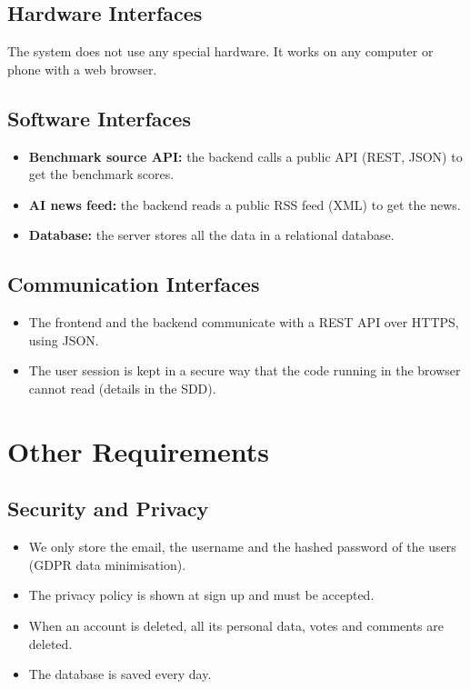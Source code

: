 \documentclass[11pt,a4paper]{article}
\begin{document}
\subsection{Hardware Interfaces}

The system does not use any special hardware. It works on any computer or phone with a web browser.

\subsection{Software Interfaces}

\begin{itemize}
  \item \textbf{Benchmark source API:} the backend calls a public API (REST, JSON) to get the benchmark scores.
  \item \textbf{AI news feed:} the backend reads a public RSS feed (XML) to get the news.
  \item \textbf{Database:} the server stores all the data in a relational database.
\end{itemize}

\subsection{Communication Interfaces}

\begin{itemize}
  \item The frontend and the backend communicate with a REST API over HTTPS, using JSON.
  \item The user session is kept in a secure way that the code running in the browser cannot read (details in the SDD).
\end{itemize}

\section{Other Requirements}

\subsection{Security and Privacy}

\begin{itemize}
  \item We only store the email, the username and the hashed password of the users (GDPR data minimisation).
  \item The privacy policy is shown at sign up and must be accepted.
  \item When an account is deleted, all its personal data, votes and comments are deleted.
  \item The database is saved every day.
\end{itemize}
\end{document}
